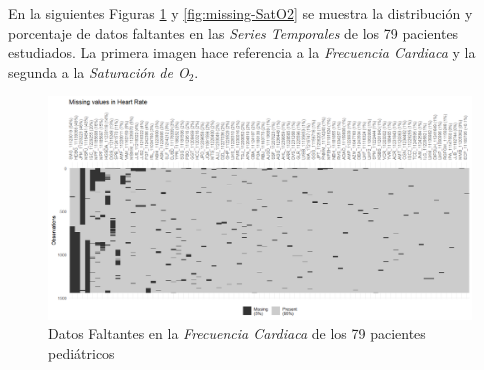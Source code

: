 En la siguientes Figuras \ref{fig:missing-FC} y \ref{fig:missing-SatO2} se muestra la distribución y porcentaje de datos faltantes en las \textit{Series Temporales} de los 79 pacientes estudiados. La primera imagen hace referencia a la \textit{Frecuencia Cardiaca} y la segunda a la \textit{Saturación de O$_2$}.

\newpage
\thispagestyle{empty}

\begin{landscape}

    \begin{figure}[H]
        \centering
        \includegraphics[scale = 0.9]{./img/missing-data-HR.png}
        \caption{Datos Faltantes en la \textit{Frecuencia Cardiaca} de los 79 pacientes pediátricos}
        \label{fig:missing-FC}
    \end{figure}
    
\end{landscape}
\restoregeometry 

\newpage
\thispagestyle{empty}

